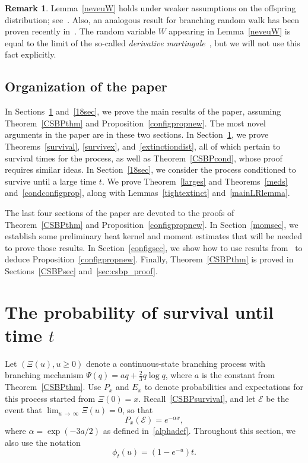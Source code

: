 \documentclass[10pt]{amsart}
\theoremstyle{definition}\newtheorem{defi}[theo]{Definition}\newtheorem{rema}[theo]{Remark}\newtheorem{exam}[theo]{Example}\newtheorem{exem}[theo]{Example}\newtheorem{nota}[theo]{Notation}
\newcommand{\clE}{\mathcal{E}}
\newcommand{\1} {\mathds{1}}
\begin{document}
\begin{rema}
Lemma~\ref{neveuW} holds under weaker assumptions on the offspring distribution; see~\cite{thesis}. Also, an analogous result for branching random walk has been proven recently in~\cite{bim20}. The random variable $W$ appearing in Lemma~\ref{neveuW} is equal to the limit of the so-called \emph{derivative martingale}~\cite{nev87}, but we will not use this fact explicitly.
\end{rema}

\subsection{Organization of the paper}\label{sec:organization}

In Sections~\ref{survivalsec} and~\ref{18sec}, we prove the main results of the paper, assuming Theorem~\ref{CSBPthm} and Proposition~\ref{configpropnew}. The most novel arguments in the paper are in these two sections. In Section~\ref{survivalsec}, we prove Theorems~\ref{survival}, \ref{survivex}, and~\ref{extinctiondist}, all of which pertain to survival times for the process, as well as Theorem~\ref{CSBPcond}, whose proof requires similar ideas. In Section~\ref{18sec}, we consider the process conditioned to survive until a large time $t$. We prove Theorem~\ref{larges} and Theorems~\ref{meds} and~\ref{condconfigprop}, along with Lemmas~\ref{tightextinct} and~\ref{mainLRlemma}.

The last four sections of the paper are devoted to the proofs of Theorem~\ref{CSBPthm} and Proposition~\ref{configpropnew}. In Section~\ref{momsec}, we establish some preliminary heat kernel and moment estimates that will be needed to prove those results. In Section~\ref{configsec}, we show how to use results from~\cite{bbs3} to deduce Proposition~\ref{configpropnew}. Finally, Theorem~\ref{CSBPthm} is proved in Sections~\ref{CSBPsec} and~\ref{sec:csbp_proof}.

\section{The probability of survival until time \texorpdfstring{$t$}{t}}\label{survivalsec}

Let $(\Xi(u), u \geq 0)$ denote a continuous-state branching process with branching mechanism $\Psi(q) = aq + \frac{2}{3} q \log q$, where $a$ is the constant from Theorem~\ref{CSBPthm}. Use $P_x$ and $E_x$ to denote probabilities and expectations for this process started from $\Xi(0) = x$. Recall~\eqref{CSBPsurvival}, and let $\clE$ be the event that $\lim_{u\,\rightarrow\,\infty} \Xi(u) = 0$, so that
\begin{equation}\label{CSBPext}
P_x(\clE) = e^{-\alpha x},
\end{equation}
where $\alpha = \exp(-3a/2)$ as defined in~\eqref{alphadef}. Throughout this section, we also use the notation
\[
\phi_t(u) = \left(1 - e^{-u}\right)t.
\]
\end{document}

